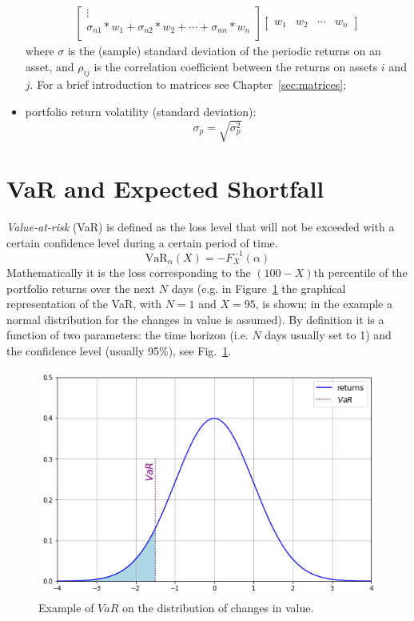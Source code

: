 \begin{itemize}
\begin{equation}
\begin{aligned}
\begin{bmatrix}
				\vdots \\
				\sigma_{n1} *w_1 + \sigma_{n2}*w_2 + \cdots + \sigma_{nn}*w_n \\
			\end{bmatrix}
			\begin{bmatrix}
				w_1 & w_2 & \cdots & w_n
			\end{bmatrix}
		\end{aligned}
	\end{equation}
	where \(\sigma\) is the (sample) standard deviation of the periodic returns on an asset, and \(\rho _{ij}\) is the correlation coefficient between the returns on assets \(i\) and \(j\). For a brief introduction to matrices see Chapter~\ref{sec:matrices};
	\item
	portfolio return volatility (standard deviation):
	\begin{equation}
		\sigma _{p}= \sqrt{\sigma _{p}^{2}}
	\end{equation}
\end{itemize}

\section{VaR and Expected Shortfall}
\label{value-at-risk}

\emph{Value-at-risk} (VaR) is defined as the loss level that will not be exceeded with a certain confidence level during a certain period of time.
\begin{equation}
\text{VaR}_{\alpha}(X) = -F^{-1}_X(\alpha)
\label{eq:var}
\end{equation}
Mathematically it is the loss corresponding to the $(100-X)\textrm{th}$ percentile of the portfolio returns over the next $N$ days (e.g. in Figure~\ref{fig:var_loss} the graphical representation of the VaR, with $N=1$ and $X=95$, is shown; in the example a normal distribution for the changes in value is assumed). By definition it is a function of two parameters: the time horizon (i.e. $N$ days usually set to 1) and the confidence level (usually 95\%), see Fig.~\ref{fig:var_loss}. 

\begin{figure}[htb]
\centering
\includegraphics[width=0.6\linewidth]{figures/95_var}
\caption{Example of $VaR$ on the distribution of changes in value.}
\label{fig:var_loss}
\end{figure}


